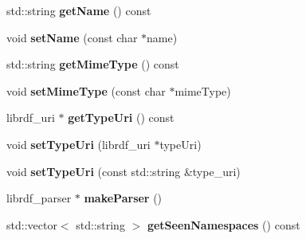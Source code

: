 \begin{DoxyCompactItemize}
std\+::string {\bfseries get\+Name} () const
\item 
\mbox{\label{classredland_1_1LibrdfParser_a152feb7bf2aa291fc7ec48fe2769265a}} 
void {\bfseries set\+Name} (const char $\ast$name)
\item 
\mbox{\label{classredland_1_1LibrdfParser_aacf1514391f15d3687a35352f1c0da3d}} 
std\+::string {\bfseries get\+Mime\+Type} () const
\item 
\mbox{\label{classredland_1_1LibrdfParser_a8fe0e89950e9b71f86fa58e10eb475d8}} 
void {\bfseries set\+Mime\+Type} (const char $\ast$mime\+Type)
\item 
\mbox{\label{classredland_1_1LibrdfParser_ae6f233d632e3a515afe7afceabf4e5ef}} 
librdf\+\_\+uri $\ast$ {\bfseries get\+Type\+Uri} () const
\item 
\mbox{\label{classredland_1_1LibrdfParser_a81d772e0be266b00bf840fd9dbeab8d1}} 
void {\bfseries set\+Type\+Uri} (librdf\+\_\+uri $\ast$type\+Uri)
\item 
\mbox{\label{classredland_1_1LibrdfParser_a76ecf31cd9fb96ba4e10a35f383e47fc}} 
void {\bfseries set\+Type\+Uri} (const std\+::string \&type\+\_\+uri)
\item 
\mbox{\label{classredland_1_1LibrdfParser_a8055c22ada8b852112f4f011d9fa5abe}} 
librdf\+\_\+parser $\ast$ {\bfseries make\+Parser} ()
\item 
\mbox{\label{classredland_1_1LibrdfParser_a2c600b9ae3b59e4ae7e48b20e3513cb4}} 
std\+::vector$<$ std\+::string $>$ {\bfseries get\+Seen\+Namespaces} () const
\end{DoxyCompactItemize}
